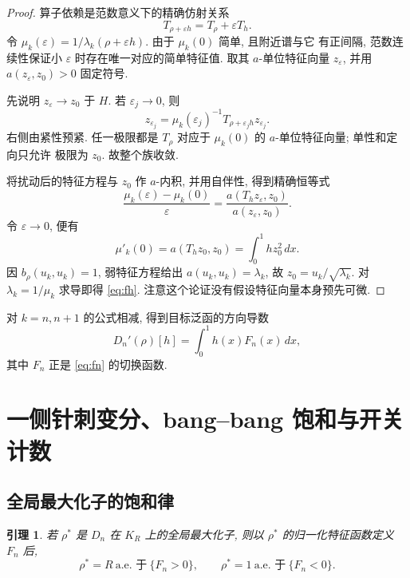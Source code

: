 \documentclass[UTF8]{ctexart}
\newtheorem{lemma}[theorem]{引理}
\begin{document}
\begin{proof}
算子依赖是范数意义下的精确仿射关系
\begin{equation*}
	T_{\rho+\varepsilon h}=T_\rho+\varepsilon T_h .
\end{equation*}
令 $\mu_k(\varepsilon)=1/\lambda_k(\rho+\varepsilon h)$. 由于 $\mu_k(0)$ 简单, 且附近谱与它
有正间隔, 范数连续性保证小 $\varepsilon$ 时存在唯一对应的简单特征值. 取其 $a$-单位特征向量
$z_\varepsilon$, 并用 $a(z_\varepsilon,z_0)>0$ 固定符号.

先说明 $z_\varepsilon\to z_0$ 于 $H$. 若 $\varepsilon_j\to0$, 则
\begin{equation*}
	z_{\varepsilon_j}=\mu_k(\varepsilon_j)^{-1}T_{\rho+\varepsilon_j h}z_{\varepsilon_j} .
\end{equation*}
右侧由紧性预紧. 任一极限都是 $T_\rho$ 对应于 $\mu_k(0)$ 的 $a$-单位特征向量; 单性和定向只允许
极限为 $z_0$. 故整个族收敛.

将扰动后的特征方程与 $z_0$ 作 $a$-内积, 并用自伴性, 得到精确恒等式
\begin{equation*}
	\frac{\mu_k(\varepsilon)-\mu_k(0)}{\varepsilon}
		=\frac{a(T_hz_\varepsilon,z_0)}{a(z_\varepsilon,z_0)} .
\end{equation*}
令 $\varepsilon\to0$, 便有
\begin{equation*}
	\mu'_k(0)=a(T_hz_0,z_0)=\int_0^1 hz_0^2\,dx .
\end{equation*}
因 $b_\rho(u_k,u_k)=1$, 弱特征方程给出 $a(u_k,u_k)=\lambda_k$, 故 $z_0=u_k/\sqrt{\lambda_k}$.
对 $\lambda_k=1/\mu_k$ 求导即得 \eqref{eq:fh}. 注意这个论证没有假设特征向量本身预先可微.
\end{proof}

对 $k=n,n+1$ 的公式相减, 得到目标泛函的方向导数
\begin{equation}
	D_n'(\rho)[h]=\int_0^1 h(x)F_n(x)\,dx,
	\label{eq:fhgap}
\end{equation}
其中 $F_n$ 正是 \eqref{eq:fn} 的切换函数.

\section{一侧针刺变分、bang--bang 饱和与开关计数}
\subsection{全局最大化子的饱和律}

\begin{lemma}\label{lem:satmax}
若 $\rho^*$ 是 $D_n$ 在 $K_R$ 上的全局最大化子, 则以 $\rho^*$ 的归一化特征函数定义 $F_n$ 后,
\begin{equation}
	\rho^*=R\ \text{a.e. 于}\ \{F_n>0\},\qquad
	\rho^*=1\ \text{a.e. 于}\ \{F_n<0\} .
	\label{eq:satmax}
\end{equation}
\end{lemma}
\end{document}
